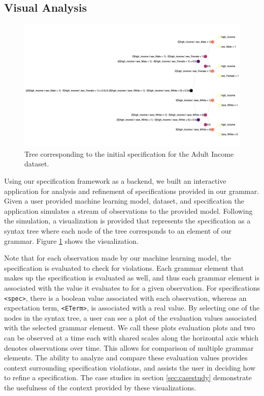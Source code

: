 \begin{subappendices}

\subsection{Visual Analysis}
\label{sec:implementation:vis}
\begin{figure}
    \centering
    \includegraphics[width=\textwidth, angle=90]{avoir/images/adult-spec-tree-initial.png}
    \caption{Tree corresponding to the initial specification for the Adult Income dataset.}
    \label{fig:impl:adult:initial-spec}
\end{figure}

Using our specification framework as a backend, we built an interactive application for analysis and refinement of specifications provided in our grammar.
Given a user provided machine learning model, dataset, and specification the application simulates a stream of observations to the provided model.
Following the simulation, a visualization is provided that represents the specification as a syntax tree where each node of the tree corresponds to an element of our grammar.
Figure \ref{fig:impl:adult:initial-spec} shows the visualization.

Note that for each observation made by our machine learning model, the specification is evaluated to check for violations.
Each grammar element that makes up the specification is evaluated as well, and thus each grammar element is associated with the value it evaluates to for a given observation.
For specifications \texttt{<spec>}, there is a boolean value associated with each observation, whereas an expectation term, \texttt{<ETerm>}, is associated with a real value.
By selecting one of the nodes in the syntax tree, a user can see a plot of the evaluation values associated with the selected grammar element.
We call these plots evaluation plots and two can be observed at a time 
each with shared scales along the horizontal axis which denotes observations over time.
This allows for comparison of multiple grammar elements.
The ability to analyze and compare these evaluation values provides context surrounding specification violations, and assists the user in deciding how to refine a specification.
The case studies in section \ref{sec:casestudy} demonstrate the usefulness of the context provided by these visualizations.


\end{subappendices}
